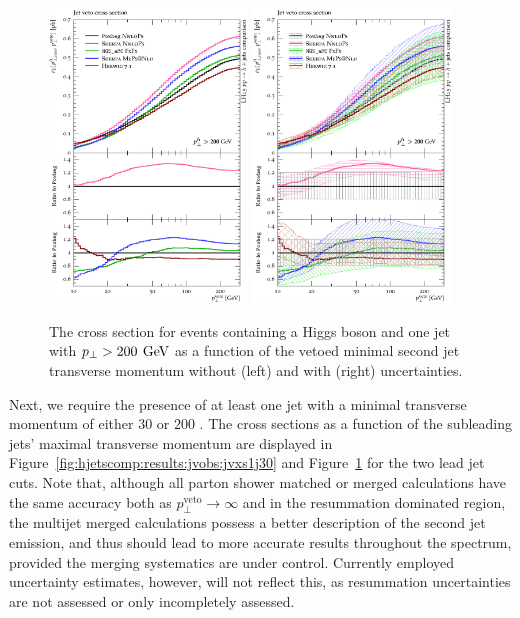 \begin{figure}[t!]
  \centering
  \includegraphics[width=0.47\textwidth]{figures/hjetscomp_u_xs_jet_veto_j1_200.pdf}
  \hfill
  \includegraphics[width=0.47\textwidth]{figures/hjetscomp_xs_jet_veto_j1_200.pdf}
  \caption{
    The cross section for events containing a Higgs boson 
    and one jet with $p_\perp>200\,\text{\:GeV}$ as a function of
    the vetoed minimal second jet transverse momentum without
    (left) and with (right) uncertainties.
    \label{fig:hjetscomp:results:jvobs:jvxs1j200}
  }
\end{figure}

Next, we require the presence of at least one jet with 
a minimal transverse momentum of either $30$ or $200$ \gev. 
The cross sections as a function of 
the subleading jets' maximal transverse momentum are displayed in 
Figure~\ref{fig:hjetscomp:results:jvobs:jvxs1j30} and 
Figure~\ref{fig:hjetscomp:results:jvobs:jvxs1j200} for the two lead jet cuts. 
Note that, although all parton 
shower matched or merged calculations have the same accuracy both as 
$p_\perp^\text{veto}\to\infty$ and in the resummation dominated region, 
the multijet merged calculations possess a better description of the 
second jet emission, and thus should lead to more accurate results 
throughout the spectrum, provided the merging systematics are under control. 
Currently employed uncertainty estimates, however, will not reflect this, 
as resummation uncertainties are not assessed or only incompletely assessed.

